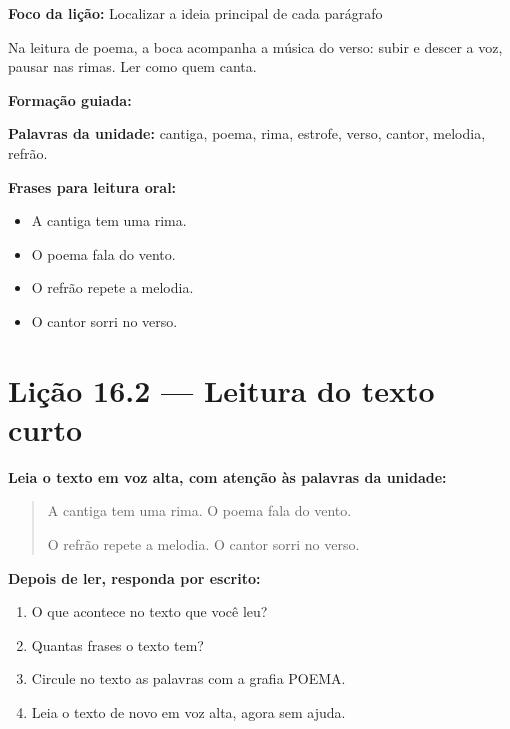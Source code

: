 \textbf{Foco da lição:} Localizar a ideia principal de cada parágrafo


\begin{boquinha}
Na leitura de poema, a boca acompanha a música do verso: subir e descer a voz, pausar nas rimas. Ler como quem canta.
\end{boquinha}

\noindent\textbf{Formação guiada:}

\begin{center}
\end{center}

\noindent\textbf{Palavras da unidade:} cantiga, poema, rima, estrofe, verso, cantor, melodia, refrão.

\noindent\textbf{Frases para leitura oral:}
\begin{itemize}[leftmargin=1.6em]
  \item A cantiga tem uma rima.
  \item O poema fala do vento.
  \item O refrão repete a melodia.
  \item O cantor sorri no verso.
\end{itemize}

\section{Lição 16.2 --- Leitura do texto curto}

\noindent\textbf{Leia o texto em voz alta, com atenção às palavras da unidade:}


\begin{quote}
A cantiga tem uma rima. O poema fala do vento.

O refrão repete a melodia. O cantor sorri no verso.
\end{quote}

\textbf{Depois de ler, responda por escrito:}
\begin{enumerate}

  \item O que acontece no texto que você leu?
  \begin{center}
  \underline{\hspace{12cm}}
  \end{center}

  \item Quantas frases o texto tem?
  \begin{center}
  \underline{\hspace{12cm}}
  \end{center}

  \item Circule no texto as palavras com a grafia POEMA.

  \item Leia o texto de novo em voz alta, agora sem ajuda.

\end{enumerate}


